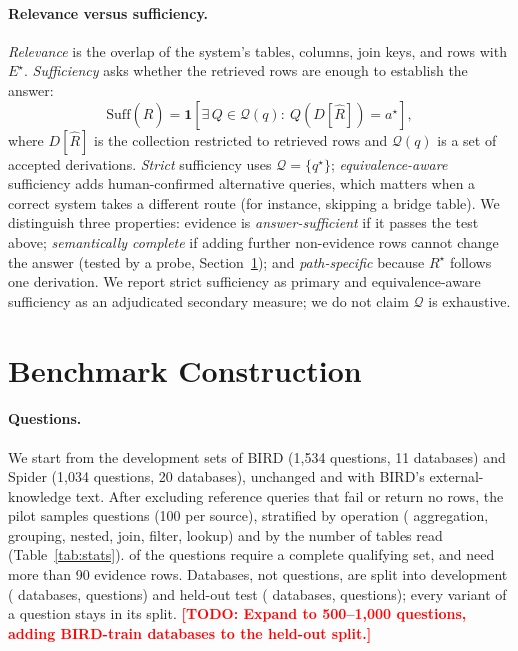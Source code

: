\documentclass[11pt]{article}
\newif\ifdraft \drafttrue   %
\newcommand{\todo}[1]{\ifdraft\textcolor{red}{\textbf{[TODO: #1]}}\fi}
\begin{document}
\paragraph{Relevance versus sufficiency.} \emph{Relevance} is the overlap of the system's tables, columns, join keys, and rows with $E^\star$. \emph{Sufficiency} asks whether the retrieved rows are enough to establish the answer:
\begin{equation}
\mathrm{Suff}(\hat R)=\mathbf 1\!\left[\exists\, Q\in\mathcal Q(q):\ Q(D[\hat R])=a^\star\right],
\end{equation}
where $D[\hat R]$ is the collection restricted to retrieved rows and $\mathcal Q(q)$ is a set of accepted derivations. \emph{Strict} sufficiency uses $\mathcal Q=\{q^\star\}$; \emph{equivalence-aware} sufficiency adds human-confirmed alternative queries, which matters when a correct system takes a different route (for instance, skipping a bridge table). We distinguish three properties: evidence is \emph{answer-sufficient} if it passes the test above; \emph{semantically complete} if adding further non-evidence rows cannot change the answer (tested by a probe, Section~\ref{sec:design}); and \emph{path-specific} because $R^\star$ follows one derivation. We report strict sufficiency as primary and equivalence-aware sufficiency as an adjudicated secondary measure; we do not claim $\mathcal Q$ is exhaustive.

\section{Benchmark Construction}\label{sec:design}

\paragraph{Questions.} We start from the development sets of BIRD (1{,}534 questions, 11 databases) and Spider (1{,}034 questions, 20 databases), unchanged and with BIRD's external-knowledge text. After excluding reference queries that fail or return no rows, the pilot samples \nQuestions{} questions (100 per source), stratified by operation (\nOpAggregate{} aggregation, \nOpGroup{} grouping, \nOpNested{} nested, \nOpJoin{} join, \nOpFilter{} filter, \nOpLookup{} lookup) and by the number of tables read (Table~\ref{tab:stats}). \nCompleteSet{} of the \nQuestions{} questions require a complete qualifying set, and \nOverNinety{} need more than 90 evidence rows. Databases, not questions, are split into development (\nDevDb{} databases, \nDevQ{} questions) and held-out test (\nTestDb{} databases, \nTestQ{} questions); every variant of a question stays in its split. \todo{Expand to 500--1{,}000 questions, adding BIRD-train databases to the held-out split.}
\end{document}
